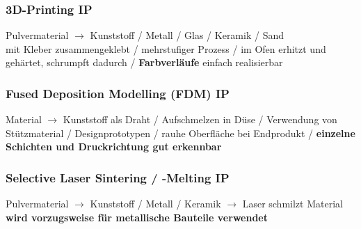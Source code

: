     \subsubsection{3D-Printing \hfill IP}
    \begin{scriptsize}
        Pulvermaterial $\to$ Kunststoff / Metall / Glas / Keramik / Sand
        \\ mit Kleber zusammengeklebt / mehrstufiger Prozess / im Ofen erhitzt und gehärtet, schrumpft dadurch / \textbf{Farbverläufe} einfach realisierbar
    \end{scriptsize}

    \subsubsection{Fused Deposition Modelling (FDM) \hfill IP}
    \begin{scriptsize}
        Material $\to$ Kunststoff als Draht / Aufschmelzen in Düse / Verwendung von Stützmaterial / Designprototypen / rauhe Oberfläche bei Endprodukt / \textbf{einzelne Schichten und Druckrichtung gut erkennbar}
    \end{scriptsize}

    \subsubsection{Selective Laser Sintering / -Melting \hfill IP}
    \begin{scriptsize}
        Pulvermaterial $\to$ Kunststoff / Metall / Keramik $\to$ Laser schmilzt Material
        \\ \textbf{wird vorzugsweise für metallische Bauteile verwendet}
    \end{scriptsize}